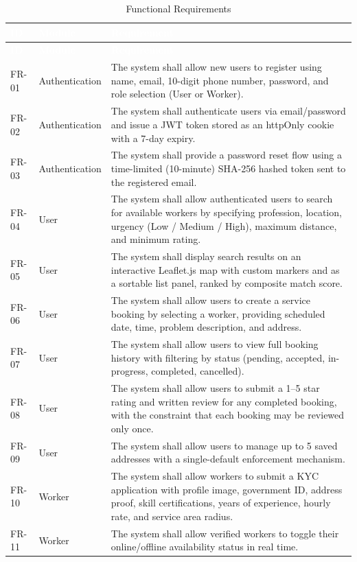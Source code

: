 \documentclass[12pt,a4paper]{report}
\newcommand{\thead}[1]{\cellcolor{tableheader}\textcolor{white}{\textbf{#1}}}
\begin{document}
\begin{longtable}{|p{0.8cm}|p{3cm}|p{9.5cm}|}
\caption{Functional Requirements}\label{tab:funcreq}\\
\hline
\thead{ID} & \thead{Module} & \thead{Requirement} \\
\hline
\endfirsthead
\hline
\thead{ID} & \thead{Module} & \thead{Requirement} \\
\hline
\endhead
FR-01 & Authentication & The system shall allow new users to register using name, email, 10-digit phone number, password, and role selection (User or Worker). \\
\hline
FR-02 & Authentication & The system shall authenticate users via email/password and issue a JWT token stored as an httpOnly cookie with a 7-day expiry. \\
\hline
FR-03 & Authentication & The system shall provide a password reset flow using a time-limited (10-minute) SHA-256 hashed token sent to the registered email. \\
\hline
FR-04 & User & The system shall allow authenticated users to search for available workers by specifying profession, location, urgency (Low / Medium / High), maximum distance, and minimum rating. \\
\hline
FR-05 & User & The system shall display search results on an interactive Leaflet.js map with custom markers and as a sortable list panel, ranked by composite match score. \\
\hline
FR-06 & User & The system shall allow users to create a service booking by selecting a worker, providing scheduled date, time, problem description, and address. \\
\hline
FR-07 & User & The system shall allow users to view full booking history with filtering by status (pending, accepted, in-progress, completed, cancelled). \\
\hline
FR-08 & User & The system shall allow users to submit a 1--5 star rating and written review for any completed booking, with the constraint that each booking may be reviewed only once. \\
\hline
FR-09 & User & The system shall allow users to manage up to 5 saved addresses with a single-default enforcement mechanism. \\
\hline
FR-10 & Worker & The system shall allow workers to submit a KYC application with profile image, government ID, address proof, skill certifications, years of experience, hourly rate, and service area radius. \\
\hline
FR-11 & Worker & The system shall allow verified workers to toggle their online/offline availability status in real time. \\

\end{longtable}
\end{document}
